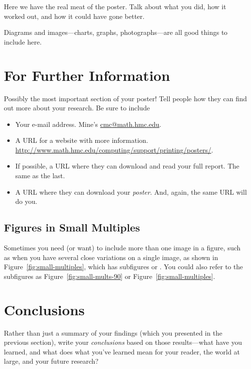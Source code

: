 \documentclass[thesis]{hmcposter}
\begin{document}
\begin{poster}
Here we have the real meat of the poster.  Talk about what you did,
how it worked out, and how it could have gone better.

Diagrams and images---charts, graphs, photographs---are all good
things to include here.


\section{For Further Information}

Possibly the most important section of your poster!  Tell people
how they can find out more about your research.  Be sure to
include
\begin{itemize}
\item Your e-mail address.  Mine's \url{cmc@math.hmc.edu}.
\item A URL for a website with more information.  \url{http://www.math.hmc.edu/computing/support/printing/posters/}.
\item If possible, a URL where they can download and read your full
  report.  The same as the last.
\item A URL where they can download your \emph{poster}.  And, again,
  the same URL will do you.
\end{itemize}


\vfill
\columnbreak


\subsection{Figures in Small Multiples}

Sometimes you need (or want) to include more than one image in a
figure, such as when you have several close variations on a single
image, as shown in Figure~\ref{fig:small-multiples}, which has
subfigures  or
.  You could also refer to the subfigures
as Figure~\ref{fig:small-mults-90} or
Figure~\ref{fig:small-multiples}.


\section{Conclusions}

Rather than just a summary of your findings (which you presented in
the previous section), write your \emph{conclusions} based on those
results---what have you learned, and what does what you've learned
mean for your reader, the world at large, and your future research?


\end{poster}
\end{document}

